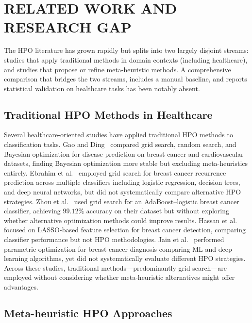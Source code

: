 \documentclass[letterpaper, 10 pt, conference]{ieeeconf}
\begin{document}
\section{RELATED WORK AND RESEARCH GAP}
\label{sec:related}

The HPO literature has grown rapidly but splits into two largely disjoint streams: studies that apply traditional methods in domain contexts (including healthcare), and studies that propose or refine meta-heuristic methods. A comprehensive comparison that bridges the two streams, includes a manual baseline, and reports statistical validation on healthcare tasks has been notably absent.

\subsection{Traditional HPO Methods in Healthcare}

Several healthcare-oriented studies have applied traditional HPO methods to classification tasks. Gao and Ding~\cite{gao2020} compared grid search, random search, and Bayesian optimization for disease prediction on breast cancer and cardiovascular datasets, finding Bayesian optimization more stable but excluding meta-heuristics entirely. Ebrahim et al.~\cite{ebrahim2024} employed grid search for breast cancer recurrence prediction across multiple classifiers including logistic regression, decision trees, and deep neural networks, but did not systematically compare alternative HPO strategies. Zhou et al.~\cite{zhou2024} used grid search for an AdaBoost--logistic breast cancer classifier, achieving $99.12\%$ accuracy on their dataset but without exploring whether alternative optimization methods could improve results. Hassan et al.~\cite{hassan2023} focused on LASSO-based feature selection for breast cancer detection, comparing classifier performance but not HPO methodologies. Jain et al.~\cite{jain2024} performed parametric optimization for breast cancer diagnosis comparing ML and deep-learning algorithms, yet did not systematically evaluate different HPO strategies. Across these studies, traditional methods---predominantly grid search---are employed without considering whether meta-heuristic alternatives might offer advantages.

\subsection{Meta-heuristic HPO Approaches}
\end{document}
